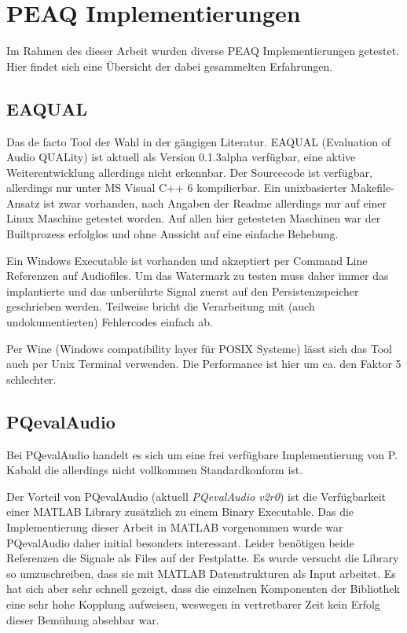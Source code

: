 \chapter{PEAQ Implementierungen}
\label{ch:peaq}

Im Rahmen des dieser Arbeit wurden diverse PEAQ Implementierungen getestet. Hier findet sich eine Übersicht der dabei gesammelten Erfahrungen.

\section{EAQUAL}

Das de facto Tool der Wahl in der gängigen Literatur\cite{xiang2007robust}\cite{kraetzer2006transparency}. EAQUAL (Evaluation of Audio QUALity) ist aktuell als Version 0.1.3alpha verfügbar, eine aktive Weiterentwicklung allerdings nicht erkennbar. Der Sourcecode ist verfügbar, allerdings nur unter MS Visual C++ 6 kompilierbar. Ein unixbasierter Makefile-Ansatz ist zwar vorhanden, nach Angaben der Readme allerdings nur auf einer Linux Maschine getestet worden. Auf allen hier getesteten Maschinen war der Builtprozess erfolglos und ohne Aussicht auf eine einfache Behebung. 

Ein Windows Executable ist vorhanden und akzeptiert per Command Line Referenzen auf Audiofiles. Um das Watermark zu testen muss daher immer das implantierte und das unberührte Signal zuerst auf den Persistenzspeicher geschrieben werden. Teilweise bricht die Verarbeitung mit (auch undokumentierten) Fehlercodes einfach ab.

Per Wine (Windows compatibility layer für POSIX Systeme) lässt sich das Tool auch per Unix Terminal verwenden. Die Performance ist hier um ca. den Faktor 5 schlechter.

\section{PQevalAudio}

Bei PQevalAudio handelt es sich um eine frei verfügbare Implementierung von P. Kabald\cite{kabal2002examination} die allerdings nicht vollkommen Standardkonform ist.

Der Vorteil von PQevalAudio (aktuell \textit{PQevalAudio v2r0}) ist die Verfügbarkeit einer MATLAB Library zusätzlich zu einem Binary Executable. Das die Implementierung dieser Arbeit in MATLAB vorgenommen wurde war PQevalAudio daher initial besonders interessant. Leider benötigen beide Referenzen die Signale als Files auf der Festplatte. Es wurde versucht die Library so umzuschreiben, dass sie mit MATLAB Datenstrukturen als Input arbeitet. Es hat sich aber sehr schnell gezeigt, dass die einzelnen Komponenten der Bibliothek eine sehr hohe Kopplung aufweisen, weswegen in vertretbarer Zeit kein Erfolg dieser Bemühung absehbar war.

